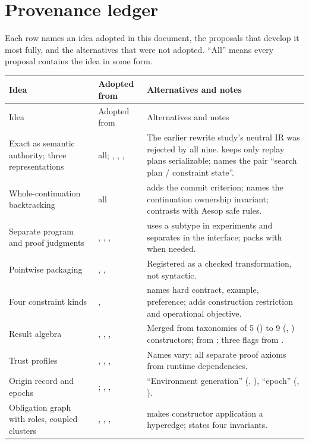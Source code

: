 \section{Provenance ledger}\label{app:provenance}

Each row names an idea adopted in this document, the proposals that develop it most fully, and the alternatives that were not adopted. ``All'' means every proposal contains the idea in some form.

{\small
\begin{longtable}{@{}L{4.3cm}L{2.3cm}L{8.5cm}@{}}
\toprule
Idea & Adopted from & Alternatives and notes \\
\midrule
\endfirsthead
\toprule
Idea & Adopted from & Alternatives and notes \\
\midrule
\endhead
Exact  as semantic authority; three representations & all; , , ,  & The earlier rewrite study's neutral IR was rejected by all nine.  keeps only replay plans serializable;  names the pair ``search plan / constraint state''. \\
Whole-continuation backtracking & all &  adds the commit criterion;  names the continuation ownership invariant;  contrasts with Aesop safe rules. \\
Separate program and proof judgments & , , ,  &  uses a subtype in experiments and separates in the interface;  packs with  when needed. \\
Pointwise packaging & , ,  & Registered as a checked transformation, not syntactic. \\
Four constraint kinds & ,  &  names hard contract, example, preference;  adds construction restriction and operational objective. \\
Result algebra & , , ,  & Merged from taxonomies of 5 () to 9 (, ) constructors;  from ; three flags from . \\
Trust profiles & , , ,  & Names vary; all separate proof axioms from runtime dependencies. \\
Origin record and epochs & ; , ,  & ``Environment generation'' (, ), ``epoch'' (, ). \\
Obligation graph with roles, coupled clusters & , , ,  &  makes constructor application a hyperedge;  states four invariants. \\

\end{longtable}}
